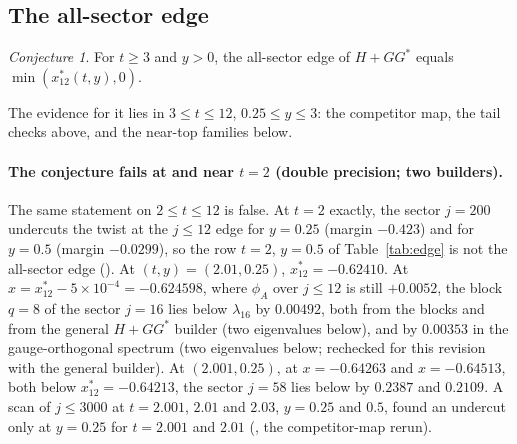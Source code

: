 \documentclass[11pt]{article}
\theoremstyle{definition}
\theoremstyle{remark}
\newtheorem{conjecture}[theorem]{Conjecture}
\begin{document}
\subsection{The all-sector edge}\label{subsec:allsector}

\begin{conjecture}\label{conj:edge}
For $t\ge3$ and $y>0$, the all-sector edge of $H+GG^*$ equals $\min(x^*_{12}(t,y),0)$.
\end{conjecture}

The evidence for it lies in $3\le t\le12$, $0.25\le y\le3$: the competitor map, the tail checks above, and the
near-top families below.

\paragraph{The conjecture fails at and near $t=2$ (double precision; two builders).} The same statement on $2\le t\le12$
is false. At $t=2$ exactly, the sector $j=200$ undercuts the twist at the $j\le12$ edge for $y=0.25$ (margin $-0.423$)
and for $y=0.5$ (margin $-0.0299$), so the row $t=2$, $y=0.5$ of Table~\ref{tab:edge} is not the all-sector edge
(). At $(t,y)=(2.01,0.25)$, $x^*_{12}=-0.62410$. At $x=x^*_{12}-5\times10^{-4}=-0.624598$, where
$\phi_A$ over $j\le12$ is still $+0.0052$, the block $q=8$ of the sector $j=16$ lies below $\lambda_{16}$ by $0.00492$,
both from the blocks and from the general $H+GG^*$ builder (two eigenvalues below), and by $0.00353$ in the
gauge-orthogonal spectrum (two eigenvalues below; rechecked for this revision with the general builder). At
$(2.001,0.25)$, at $x=-0.64263$ and $x=-0.64513$, both below $x^*_{12}=-0.64213$, the sector $j=58$ lies below by
$0.2387$ and $0.2109$. A scan of $j\le3000$ at $t=2.001$, $2.01$ and $2.03$, $y=0.25$ and $0.5$, found an undercut only at
$y=0.25$ for $t=2.001$ and $2.01$ (, the competitor-map
rerun).
\end{document}
